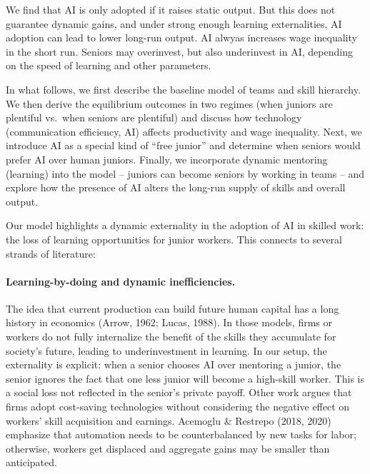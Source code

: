 \documentclass[12pt]{article}
\begin{document}
We find that AI is only adopted if it raises static output. But this does not guarantee dynamic gains, and under strong enough learning externalities, AI adoption can lead to lower long-run output. AI alwyas increases wage inequality in the short run. Seniors may overinvest, but also underinvest in AI, depending on the speed of learning and other parameters.

In what follows, we first describe the baseline model of teams and skill
hierarchy. We then derive the equilibrium outcomes in two regimes (when
juniors are plentiful vs.~when seniors are plentiful) and discuss how
technology (communication efficiency, AI) affects productivity and wage
inequality. Next, we introduce AI as a special kind of ``free junior''
and determine when seniors would prefer AI over human juniors. Finally,
we incorporate {dynamic mentoring (learning)} into the model --
juniors can become seniors by working in teams -- and explore how the
presence of AI alters the long-run supply of skills and overall output.

\bigskip

Our model highlights a {dynamic externality} in the adoption of
AI in skilled work: the loss of learning opportunities for junior
workers. This connects to several strands of literature:

\paragraph{Learning-by-doing and dynamic inefficiencies.} The idea that
current production can build future human capital has a long history
in economics (Arrow, 1962; Lucas, 1988). In those models, firms or
workers do not fully internalize the benefit of the skills they
accumulate for society's future, leading to underinvestment in
learning. In our setup, the externality is explicit: when a senior
chooses AI over mentoring a junior, the senior ignores the fact that
one less junior will become a high-skill worker. This is a social loss
not reflected in the senior's private payoff. Other work argues that firms adopt cost-saving
technologies without considering the negative effect on workers' skill
acquisition and earnings. Acemoglu \& Restrepo (2018, 2020) emphasize
that automation needs to be counterbalanced by new tasks for labor;
otherwise, workers get displaced and aggregate gains may be smaller
than anticipated. 
\end{document}
